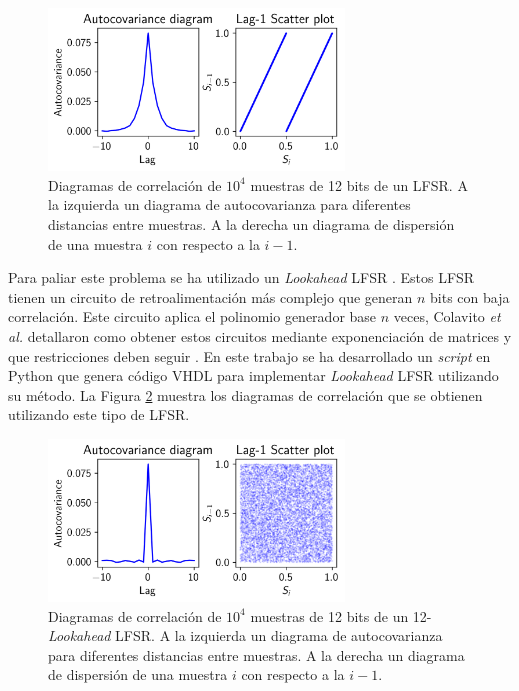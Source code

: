 \begin{figure}[h]
    \centering
    \includegraphics[width=0.7\textwidth]{root/Imagenes/riscv_ext/lfsr_bar_corr.png}
    \caption{Diagramas de correlación de $10^4$ muestras de 12 bits de un LFSR. A la izquierda un diagrama de autocovarianza para diferentes distancias entre muestras. A la derecha un diagrama de dispersión de una muestra $i$ con respecto a la $i-1$.}
    \label{fig:lfsr_bar_corr}
\end{figure}

Para paliar este problema se ha utilizado un \textit{Lookahead} LFSR \cite{look_ahead_lfsr_base}. Estos LFSR tienen un circuito de retroalimentación más complejo que generan $n$ bits con baja correlación. Este circuito aplica el polinomio generador base $n$ veces, Colavito \emph{et al.} detallaron como obtener estos circuitos mediante exponenciación de matrices y que restricciones deben seguir \cite{look_ahead_lfsr_design}. En este trabajo se ha desarrollado un \textit{script} en Python que genera código VHDL para implementar \textit{Lookahead} LFSR utilizando su método. La Figura \ref{fig:lfsr_good_corr} muestra los diagramas de correlación que se obtienen utilizando este tipo de LFSR.

\begin{figure}[h]
    \centering
    \includegraphics[width=0.7\textwidth]{root/Imagenes/riscv_ext/lfsr_good_corr.png}
    \caption{Diagramas de correlación de $10^4$ muestras de 12 bits de un 12-\textit{Lookahead} LFSR. A la izquierda un diagrama de autocovarianza para diferentes distancias entre muestras. A la derecha un diagrama de dispersión de una muestra $i$ con respecto a la $i-1$.}
    \label{fig:lfsr_good_corr}
\end{figure}

